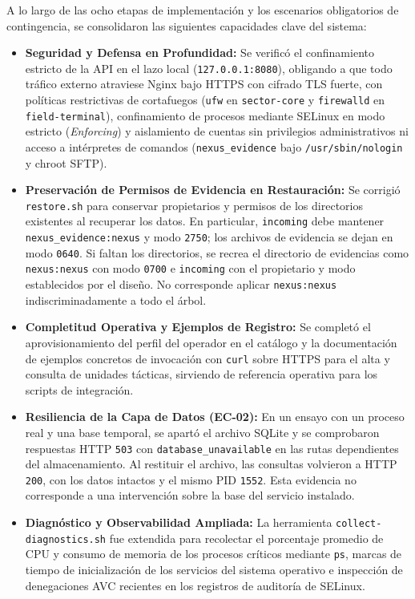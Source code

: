 \documentclass[10pt,a4paper]{article}
\begin{document}
A lo largo de las ocho etapas de implementación y los escenarios obligatorios de contingencia, se consolidaron las siguientes capacidades clave del sistema:
\begin{itemize}[leftmargin=*]
    \item \textbf{Seguridad y Defensa en Profundidad:} Se verificó el confinamiento estricto de la API en el lazo local (\texttt{127.0.0.1:8080}), obligando a que todo tráfico externo atraviese Nginx bajo HTTPS con cifrado TLS fuerte, con políticas restrictivas de cortafuegos (\texttt{ufw} en \texttt{sector-core} y \texttt{firewalld} en \texttt{field-terminal}), confinamiento de procesos mediante SELinux en modo estricto (\textit{Enforcing}) y aislamiento de cuentas sin privilegios administrativos ni acceso a intérpretes de comandos (\texttt{nexus\_evidence} bajo \texttt{/usr/sbin/nologin} y chroot SFTP).
    \item \textbf{Preservación de Permisos de Evidencia en Restauración:} Se corrigió \texttt{restore.sh} para conservar propietarios y permisos de los directorios existentes al recuperar los datos. En particular, \texttt{incoming} debe mantener \texttt{nexus\_evidence:nexus} y modo \texttt{2750}; los archivos de evidencia se dejan en modo \texttt{0640}. Si faltan los directorios, se recrea el directorio de evidencias como \texttt{nexus:nexus} con modo \texttt{0700} e \texttt{incoming} con el propietario y modo establecidos por el diseño. No corresponde aplicar \texttt{nexus:nexus} indiscriminadamente a todo el árbol.
    \item \textbf{Completitud Operativa y Ejemplos de Registro:} Se completó el aprovisionamiento del perfil del operador en el catálogo y la documentación de ejemplos concretos de invocación con \texttt{curl} sobre HTTPS para el alta y consulta de unidades tácticas, sirviendo de referencia operativa para los scripts de integración.
    \item \textbf{Resiliencia de la Capa de Datos (EC-02):} En un ensayo con un proceso real y una base temporal, se apartó el archivo SQLite y se comprobaron respuestas HTTP \texttt{503} con \texttt{database\_unavailable} en las rutas dependientes del almacenamiento. Al restituir el archivo, las consultas volvieron a HTTP \texttt{200}, con los datos intactos y el mismo PID \texttt{1552}. Esta evidencia no corresponde a una intervención sobre la base del servicio instalado.
    \item \textbf{Diagnóstico y Observabilidad Ampliada:} La herramienta \texttt{collect-diagnostics.sh} fue extendida para recolectar el porcentaje promedio de CPU y consumo de memoria de los procesos críticos mediante \texttt{ps}, marcas de tiempo de inicialización de los servicios del sistema operativo e inspección de denegaciones AVC recientes en los registros de auditoría de SELinux.

\end{itemize}
\end{document}
